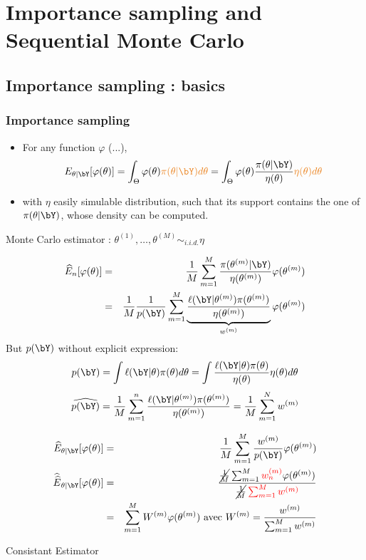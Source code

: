 \section{Importance sampling and Sequential Monte Carlo}
\subsection{Importance sampling : basics}
\begin{frame}[allowframebreaks]\frametitle{Importance sampling}


\begin{itemize}


\item For any function  $\varphi$ (...), $$E_{\theta | \bY} [\varphi(\theta)] = \int_\Theta \varphi(\theta) \vert \pi(\theta|\bY) d\theta\noir = \int_\Theta \varphi(\theta) \frac{\pi(\theta|\bY)}{\eta(\theta)}\vert \eta(\theta) d\theta\noir  $$
\item with  $\eta$ easily simulable distribution, such that its support contains the one of $\pi(\theta|\bY)$,  whose density can be computed.  
\end{itemize} 
 \framebreak
 

\vert  Monte Carlo estimator \noir  : $\theta^{(1)}, \dots , \theta^{(M)} \sim_{i.i.d.} \eta$
 
\begin{eqnarray*}
\widehat{E}_n[\varphi(\theta)] &=& \frac{1}{M}  \sum_{m=1}^M \frac{\pi(\theta^{(m)}| \bY)}{\eta(\theta^{(m)})}   \varphi(\theta^{(m)})\\&=&   \frac{1}{M}  \frac{1}{p(\bY)} \sum_{m=1}^M   \underbrace{\frac{ \ell(\bY | \theta^{(m)}) \pi(\theta^{(m)})}{ \eta(\theta ^{(m)})}}_{w^{(m)} }  \varphi(\theta^{(m)}) 
\end{eqnarray*}
 \vert But \noir  $p(\bY) $ without explicit expression:  $$p(\bY)  = \int  \ell(\bY | \theta) \pi(\theta)d\theta = \int \frac{ \ell(\bY | \theta) \pi(\theta)}{\eta(\theta)} \eta(\theta)d\theta  $$
$$\widehat{p(\bY)} =\frac{1}{M} \sum_{m=1}^n\frac{ \ell(\bY | \theta^{(m)}) \pi(\theta^{(m)})}{\eta(\theta ^{(m)})}  = \frac{1}{M}\sum_{m=1}^N w^{(m)}$$

  \begin{eqnarray*}
\widehat{E}_{\theta|\bY}[\varphi(\theta)] &=&  \frac{1}{M}  \sum_{m=1}^M  \frac{w^{(m)}}{p(\bY)} \varphi(\theta^{(m)})\\
\widehat{\widehat{E}}_{\theta | \bY} [\varphi(\theta)] &=& \frac{\cancel{\frac{1}{M}}  \sum_{m=1}^M  \rouge w_n^{(m)} \noir \varphi(\theta^{(m)})} { \cancel{\frac{1}{M}}  \rouge \sum_{m=1}^M  w^{(m)} \noir}\\
&=&   \sum_{m=1}^M  W^{(m)}  \varphi(\theta^{(m)})   \mbox{ avec } W^{(m)} = \frac{w^{(m)}}{ \sum_{m=1}^M w^{(m)}} 
\end{eqnarray*}
\begin{center}\vert Consistant Estimator \end{center}
\end{frame}

